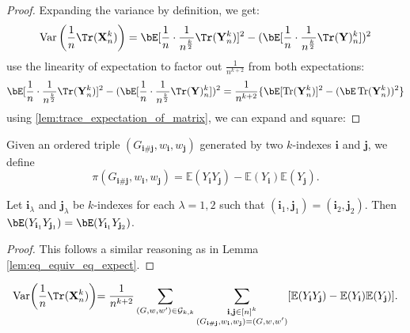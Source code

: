 \begin{proof}
    \notready
    Expanding the variance by definition, we get:
    $$
    \operatorname{Var}\left(\frac{1}{n}\Tr(\mathbf{X}_{n}^{k})\right) = \bE[\frac{1}{n} \cdot \frac{1}{n^{\frac{k}{2}}} \Tr(\mathbf{Y}_{n}^{k})]^2 - (\bE[\frac{1}{n}\cdot \frac{1}{n^{\frac{k}{2}}} \Tr(\mathbf{Y})_{n}^{k}])^2
    $$
    use the linearity of expectation to factor out $\frac{1}{n^{k+2}}$ from both expectations:
    $$
    \bE[\frac{1}{n} \cdot \frac{1}{n^{\frac{k}{2}}} \Tr(\mathbf{Y}_{n}^{k})]^2 - (\bE[\frac{1}{n}\cdot \frac{1}{n^{\frac{k}{2}}} \Tr(\mathbf{Y})_{n}^{k}])^2 = \frac{1}{n^{k+2}} \{\bE[\operatorname{Tr}(\mathbf{Y}_{n}^{k})]^2 - (\bE \operatorname{Tr}(\mathbf{Y}_{n}^{k}))^2\}
    $$
    using \ref{lem:trace_expectation_of_matrix}, we can expand and square:
\end{proof}


\begin{definition}
  \notready
  \label{def:common_val_prod_of}
  Given an ordered triple $(G_{\mathbf{i}\#\mathbf{j}},w_\mathbf{i},w_\mathbf{j})$ generated by two $k$-indexes $\mathbf{i}$ and $\mathbf{j}$, we define
  \[
  \pi(G_{\mathbf{i}\#\mathbf{j}},w_\mathbf{i},w_\mathbf{j}) = \mathbb{E}(Y_\mathbf{i} Y_\mathbf{j}) - \mathbb{E}(Y_\mathbf{i}) \mathbb{E}(Y_\mathbf{j}).
  \]
\end{definition}


\begin{lemma}
  \notready
  \label{lem:common_val_eq_of_index_pair_rel}
  Let $\mathbf{i}_\lambda$ and $\mathbf{j}_\lambda$ be $k$-indexes for each $\lambda=1,2$ such that $(\mathbf{i}_1,\mathbf{j}_1) = (\mathbf{i}_2,\mathbf{j}_2)$.
  Then $\bE (Y_{\mathbf{i}_1}Y_{\mathbf{j}_1}) = \bE (Y_{\mathbf{i}_1}Y_{\mathbf{j}_2})$.
\end{lemma}

\begin{proof}
  This follows a similar reasoning as in Lemma \ref{lem:eq_equiv_eq_expect}.
\end{proof}


\begin{lemma}
  \notready
  \label{lem:sum_eq_sum_over_classes}
  \[
  \text{Var} \biggl(\frac{1}{n} \Tr (\mathbf{X}_n^k) \biggl)
  = \frac{1}{n^{k+2}} \sum_{(G,w,w') \in \mathcal{G}_{k,k}} \sum_{\substack{\mathbf{i},\mathbf{j} \in [n]^k \\ (G_{\mathbf{i}\#\mathbf{j}},w_\mathbf{i},w_\mathbf{j}) = (G,w,w')}} [\mathbb{E}(Y_\mathbf{i} Y_\mathbf{j}) - \mathbb{E}(Y_\mathbf{i}) \mathbb{E}(Y_\mathbf{j})].
  \]
\end{lemma}

